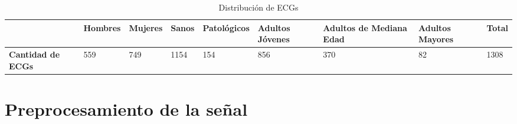 \documentclass[12pt,letterpaper,oneside,openright]{book}
\begin{document}
\begin{table}[t]
	\begin{center}
		\begin{tabular}{|p{1.85cm}|M{1.7cm}|M{1.55cm}|M{1.15cm}|M{2.2cm}|M{1.5cm}|M{1.5cm}|M{1.5cm}|M{1cm}|}
			\hline
			& \textbf{Hombres} & \textbf{Mujeres} & \textbf{Sanos} & \textbf{Patológicos} & \textbf{Adultos Jóvenes} & \textbf{Adultos de Mediana Edad} & \textbf{Adultos Mayores} & \textbf{Total} \\
			\hline
			\textbf{Cantidad de ECGs} & 559 & 749 & 1154 & 154 & 856 & 370 & 82 & 1308 \\
			\hline
		\end{tabular}
		\caption{Distribución de ECGs}
		\label{tab:distriECGs}
	\end{center}
\end{table}


\section{Preprocesamiento de la señal}
	
\end{document}
